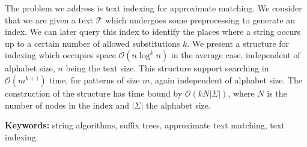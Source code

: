 The problem we address is text indexing for approximate matching. We consider that we are given a text $\mathcal{T}$ which undergoes some preprocessing to generate an index. We can later query this index to identify the places where a string occurs up to a certain number of allowed substitutions $k$. We present a structure for indexing which occupies space $\mathcal{O}(n\log^kn)$ in the average case, independent of alphabet size, $n$ being the text size. This structure support searching in $\mathcal{O}(m^{k+1})$ time, for patterns of size $m$, again independent of alphabet size. The construction of the structure has time bound by $\mathcal{O}(kN|\Sigma|)$, where $N$ is the number of nodes in the index and $|\Sigma|$ the alphabet size.

\textbf{Keywords:} string algorithms, suffix trees, approximate text matching, text indexing.
